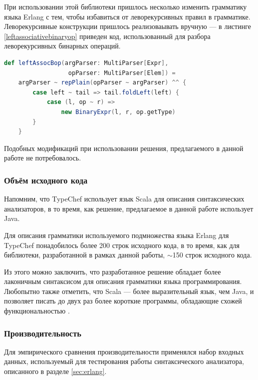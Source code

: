 При использовании этой библиотеки пришлось несколько изменить грамматику языка Erlang с тем, чтобы избавиться от леворекурсивных правил в грамматике. Леворекурсивные конструкции пришлось реализоваывать вручную --- в листинге \ref{leftassociativebinaryop} приведен код, использованный для разбора леворекурсивных бинарных операций. 

\begin{minipage}{\linewidth}
\begin{lstlisting}[caption={Реализация леворекурсивных конструкций в TypeChef},label=leftassociativebinaryop,language=Scala]
def leftAssocBop(argParser: MultiParser[Expr], 
                  opParser: MultiParser[Elem]) =
	argParser ~ repPlain(opParser ~ argParser) ^^ {
		case left ~ tail => tail.foldLeft(left) {
			case (l, op ~ r) => 
				new BinaryExpr(l, r, op.getType)
		}
	}
\end{lstlisting}
\end{minipage}

Подобных модификаций при использовании решения, предлагаемого в данной работе не потребовалось.

\subsubsection{Объём исходного кода}

Напомним, что TypeChef использует язык Scala для описания синтаксических анализаторов, в то время, как решение, предлагаемое в данной работе использует Java.

Для описания грамматики используемого подмножества языка Erlang для TypeChef понадобилось более 200 строк исходного кода, в то время, как для библиотеки, разработанной в рамках данной работы, $\sim$150 строк исходного кода.

Из этого можно заключить, что разработанное решение обладает более лаконичным синтаксисом для описания грамматики языка программирования. Любопытно также отметить, что Scala --- более выразительный язык, чем Java, и позволяет писать до двух раз более короткие программы, обладающие схожей функциональностью \cite{scalavsjava}.


\subsubsection{Производительность}

Для эмпирического сравнения производительности применялся набор входных данных, используемый для тестирования работы синтаксического анализатора, описанного в разделе \ref{sec:erlang}.

